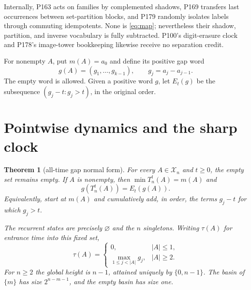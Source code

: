 \documentclass[a4paper,10pt]{amsart}
\newtheorem{theorem}{Theorem}
\theoremstyle{remark}
\newcommand{\X}{\mathcal X}
\begin{document}
Internally, P163 acts on families by complemented shadows, P169 transfers
last occurrences between set-partition blocks, and P179 randomly isolates
labels through commuting idempotents.  None is \eqref{eq:map}; nevertheless
their shadow, partition, and inverse vocabulary is fully subtracted.  P100's
digit-erasure clock and P178's image-tower bookkeeping likewise receive no
separation credit.

For nonempty $A$, put $m(A)=a_0$ and define its positive gap word
\begin{equation}\label{eq:gaps}
 g(A)=(g_1,\ldots,g_{k-1}),\qquad g_j=a_j-a_{j-1}.
\end{equation}
The empty word is allowed.  Given a positive word $g$, let
$E_t(g)$ be the subsequence $(g_j-t:g_j>t)$, in the original order.

\section{Pointwise dynamics and the sharp clock}

\begin{theorem}[all-time gap normal form]\label{thm:gap}
For every $A\in\X_n$ and $t\ge0$, the empty set remains empty.  If $A$ is
nonempty, then $\min T_n^t(A)=m(A)$ and
\begin{equation}\label{eq:gap-iterate}
             g(T_n^t(A))=E_t(g(A)).
\end{equation}
Equivalently, start at $m(A)$ and cumulatively add, in order, the terms
$g_j-t$ for which $g_j>t$.

The recurrent states are precisely $\varnothing$ and the $n$ singletons.
Writing $\tau(A)$ for entrance time into this fixed set,
\begin{equation}\label{eq:clock}
 \tau(A)=
 \begin{cases}
 0,&|A|\le1,\\
 \max_{1\le j<|A|}g_j,&|A|\ge2.
 \end{cases}
\end{equation}
For $n\ge2$ the global height is $n-1$, attained uniquely by
$\{0,n-1\}$.  The basin of $\{m\}$ has size $2^{n-m-1}$, and the empty
basin has size one.
\end{theorem}
\end{document}
